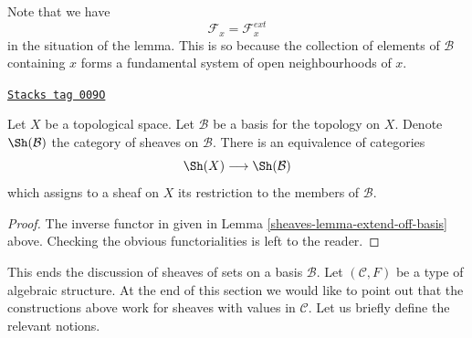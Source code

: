 Note that we have
$$
\mathcal{F}_x = \mathcal{F}_x^{ext}
$$
in the situation of the lemma. This is so because the
collection of elements of $\mathcal{B}$ containing
$x$ forms a fundamental system of open neighbourhoods of $x$.

\begin{lemma}
\label{sheaves-lemma-restrict-basis-equivalence}
\href{https://stacks.math.columbia.edu/tag/009O}{\texttt{Stacks tag 009O}}

Let $X$ be a topological space.
Let $\mathcal{B}$ be a basis for the topology on $X$.
Denote $\Sh(\mathcal{B})$ the category of
sheaves on $\mathcal{B}$.
There is an equivalence of categories
$$
\Sh(X) \longrightarrow \Sh(\mathcal{B})
$$
which assigns to a sheaf on $X$ its restriction to
the members of $\mathcal{B}$.
\end{lemma}

\begin{proof}

The inverse functor in given in Lemma \ref{sheaves-lemma-extend-off-basis} above.
Checking the obvious functorialities is left to the
reader.
\end{proof}

This ends the discussion of sheaves of sets on
a basis $\mathcal{B}$. Let $(\mathcal{C}, F)$ be
a type of algebraic structure. At the end of this section
we would like to point out that the constructions
above work for sheaves with values in $\mathcal{C}$.
Let us briefly define the relevant notions.

